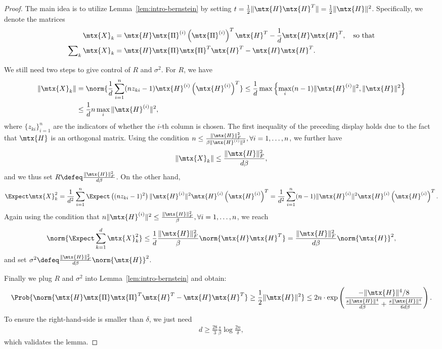 \documentclass{article}
\begin{document}
\begin{proof}
The main idea is to utilize Lemma~\ref{lem:intro-bernstein} by setting $t = \frac12 \|\mtx{H} \mtx{H}^T\| = \frac12 \|\mtx{H}\|^2$.
Specifically, we denote the matrices 
\begin{align*}
\mtx{X}_k &= \mtx{H} \mtx{\Pi}^{(i)} \left(\mtx{\Pi}^{(i)}\right)^T \mtx{H}^T - \frac1d \mtx{H} \mtx{H}^T, \quad \text{so that} \\
\sum\nolimits_k \mtx{X}_k &= \mtx{H} \mtx{\Pi} \mtx{\Pi}^T \mtx{H}^T - \mtx{H} \mtx{H}^T.
\end{align*}

We still need two steps to give control of $R$ and $\sigma^2$.
For $R$, we have
\begin{align*}
\|\mtx{X}_k\| &= \norm{\frac1d \sum_{i=1}^n (n z_{ki} -1) \mtx{H}^{(i)} \left(\mtx{H}^{(i)}\right)^T}
\leq \frac1d \max \left\{\max_i (n - 1) \|\mtx{H}^{(i)}\|^2, \|\mtx{H}\|^2 \right\} \\
&\leq \frac1d n \max_i \|\mtx{H}^{(i)}\|^2,
\end{align*}
where $\{z_{ki}\}_{i=1}^n$ are the indicators of whether the $i$-th column is chosen.
The first inequality of the preceding display holds due to the fact that $\mtx{H}$ is an orthogonal matrix.
Using the condition $n \leq \frac{\|\mtx{H}\|_F^2}{\beta \|\mtx{H}^{(i)}\|^2}, \forall i = 1,\dots,n$, we further have
\begin{align*}
\|\mtx{X}_k\| \leq \frac{\|\mtx{H}\|_F^2}{d \beta},
\end{align*}
and we thus set $R \defeq \frac{\|\mtx{H}\|_F^2}{d \beta}$.
On the other hand,
\begin{align*}
\Expect \mtx{X}_k^2 
= \frac{1}{d^2} \sum_{i=1}^n \Expect \left( (n z_{ki} -1)^2 \right) \|\mtx{H}^{(i)}\|^2 \mtx{H}^{(i)} \left(\mtx{H}^{(i)}\right)^T
= \frac{1}{d^2} \sum_{i=1}^n (n-1) \|\mtx{H}^{(i)}\|^2 \mtx{H}^{(i)} \left(\mtx{H}^{(i)}\right)^T.
\end{align*}
Again using the condition that $n \|\mtx{H}^{(i)}\|^2 \leq \frac{\|\mtx{H}\|_F^2}{\beta}, \forall i = 1,\dots,n$, we reach
\begin{align*}
\norm{\Expect \sum_{k=1}^d \mtx{X}_k^2} \leq \frac1d \frac{\|\mtx{H}\|_F^2}{\beta} \norm{\mtx{H} \mtx{H}^T} 
= \frac{\|\mtx{H}\|_F^2}{d \beta} \norm{\mtx{H}}^2,
\end{align*}
and set $\sigma^2 \defeq \frac{\|\mtx{H}\|_F^2}{d \beta} \norm{\mtx{H}}^2$.

Finally we plug $R$ and $\sigma^2$ into Lemma~\ref{lem:intro-bernstein} and obtain:
\begin{align*}
\Prob{ \norm{\mtx{H} \mtx{\Pi} \mtx{\Pi}^T \mtx{H}^T - \mtx{H} \mtx{H}^T} \geq \frac12 \|\mtx{H}\|^2}
	\leq 2n \cdot \exp\left( \frac{-\|\mtx{H}\|^4/8}{\frac{s \|\mtx{H}\|^4}{d \beta} + \frac{s \|\mtx{H}\|^4}{6 d \beta}} \right).
\end{align*}
To ensure the right-hand-side is smaller than $\delta$, we just need
\begin{align*}
d \geq \frac{28}{3} \frac{s}{\beta} \log \frac{2n}{\delta},
\end{align*}
which validates the lemma.
\end{proof}
\end{document}
